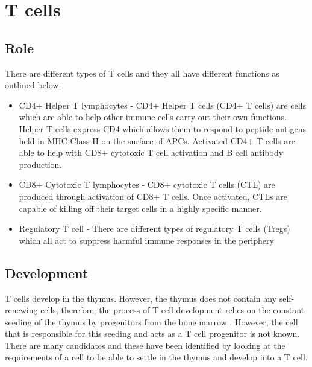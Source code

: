 \section{T cells}
\subsection{Role}
\label{subsec:Tcellfunctions}

There are different types of T cells and they all have different functions as outlined below:


\begin{itemize}
\item CD4+ Helper T lymphocytes - CD4+ Helper T cells (CD4+ T cells) are cells which are able to help other immune cells carry out their own functions. 
Helper T cells express CD4 which allows them to respond to peptide antigens held in MHC Class II on the surface of APCs. 
Activated CD4+ T cells are able to help with CD8+ cytotoxic T cell activation and B cell antibody production.
\item CD8+ Cytotoxic T lymphocytes - CD8+ cytotoxic T cells (CTL) are produced through activation of CD8+ T cells.
Once activated, CTLs are capable of killing off their target cells in a highly specific manner.
\item Regulatory T cell - There are different types of regulatory T cells (Tregs) which all act to suppress harmful immune responses in the periphery
\end{itemize}


\subsection{Development}
\label{subsec:Tcelldevelopment}

T cells develop in the thymus.
However, the thymus does not contain any self-renewing cells, therefore, the process of T cell development relies on the constant seeding of the thymus by progenitors from the bone marrow \citep{Zlotoff2011, Heinzel2007}.
However, the cell that is responsible for this seeding and acts as a T cell progenitor is not known.
There are many candidates and these have been identified by looking at the requirements of a cell to be able to settle in the thymus and develop into a T cell.


